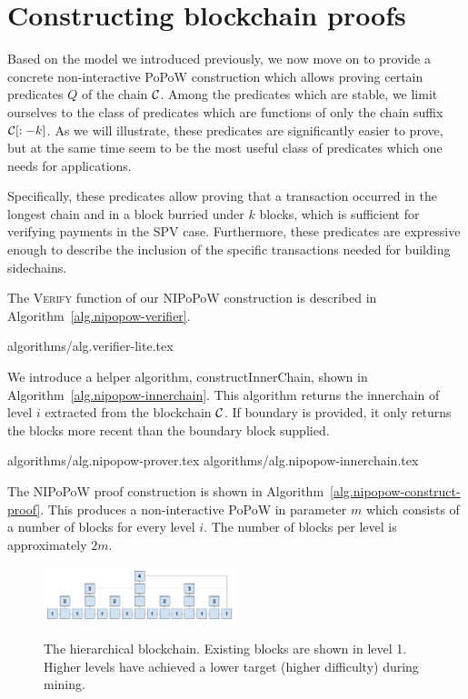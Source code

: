 \section{Constructing blockchain proofs}

Based on the model we introduced previously, we now move on to provide a
concrete non-interactive PoPoW construction which allows proving certain
predicates $Q$ of the chain $\mathcal{C}$. Among the predicates which are stable, we
limit ourselves to the class of predicates which are functions of only the
chain suffix $\mathcal{C}[:-k]$. As we will illustrate, these predicates are
significantly easier to prove, but at the same time seem to be the most useful
class of predicates which one needs for applications.

Specifically, these predicates allow proving that a transaction occurred in the
longest chain and in a block burried under $k$ blocks, which is sufficient for
verifying payments in the SPV case. Furthermore, these predicates are
expressive enough to describe the inclusion of the specific transactions needed
for building sidechains.

The \textsc{Verify} function of our NIPoPoW construction is described in
Algorithm~\ref{alg.nipopow-verifier}.

{algorithms/alg.verifier-lite.tex}

We introduce a helper algorithm, constructInnerChain, shown in
Algorithm~\ref{alg.nipopow-innerchain}. This algorithm returns the innerchain
of level $i$ extracted from the blockchain $\mathcal{C}$. If boundary is provided,
it only returns the blocks more recent than the boundary block supplied.

{algorithms/alg.nipopow-prover.tex}
{algorithms/alg.nipopow-innerchain.tex}

The NIPoPoW proof construction is shown in Algorithm~\ref{alg.nipopow-construct-proof}.
This produces a non-interactive PoPoW in parameter $m$ which consists of a
number of blocks for every level $i$. The number of blocks per level is
approximately $2m$.

\begin{figure}[h]
    \caption{The hierarchical blockchain. Existing blocks are shown in level 1.
    Higher levels have achieved a lower target (higher difficulty) during mining.}
    \centering
    \includegraphics[width=0.5\textwidth,keepaspectratio]{figures/hierarchical-ledger.png}
    \label{fig:hierarchy}
\end{figure}


